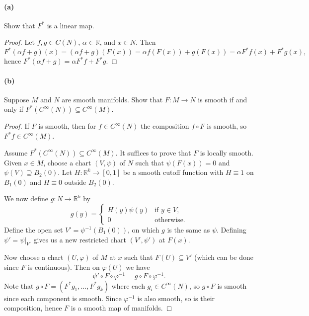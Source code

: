 \documentclass[12pt]{article}
\newlength{\myparskip}
\newenvironment{fullbox}{\begin{lrbox}{\savefullbox}\begin{minipage}{\dimexpr\textwidth-2\fboxsep\relax}\setlength{\parskip}{\myparskip}}{\end{minipage}\end{lrbox}\framebox[\textwidth]{\usebox{\savefullbox}}}
\newenvironment{pbox}[1][]{\begin{fullbox}\def\temp{#1}\ifx\temp\empty\else\paragraph{#1}\phantom{}\fi}{\end{fullbox}}
\theoremstyle{definition}
\newcommand{\R}{\mathbb{R}}
\renewcommand{\phi}{\varphi}
\newcommand{\<}{\langle}
\renewcommand{\>}{\rangle}
\newcommand{\seq}{\subseteq}
\begin{document}
\begin{pbox}[(a)]
    Show that $F^*$ is a linear map.
\end{pbox}

\begin{proof}
    Let $f, g \in C(N)$, $\alpha \in \R$, and $x \in N$.
    Then
    \[
        F^*(\alpha f + g)(x)
            = (\alpha f + g)(F(x))
            = \alpha f(F(x)) + g(F(x))
            = \alpha F^*f(x) + F^*g(x),
    \]
    hence $F^*(\alpha f + g) = \alpha F^*f + F^*g$.
\end{proof}

\begin{pbox}[(b)]
    Suppose $M$ and $N$ are smooth manifolds. Show that $F : M\to N$ is smooth if and only if $F^*(C^\infty(N)) \subseteq C^\infty(M)$.
\end{pbox}



\begin{proof}
    If $F$ is smooth, then for $f \in C^\infty(N)$ the composition $f \circ F$ is smooth, so $F^*f \in C^\infty(M)$.

    Assume $F^*(C^\infty(N)) \seq C^\infty(M)$.
    It suffices to prove that $F$ is locally smooth.
    Given $x \in M$, choose a chart $(V, \psi)$ of $N$ such that $\psi(F(x)) = 0$ and $\psi(V) \supseteq B_2(0)$.
    Let $H : \R^k \to [0,1]$ be a smooth cutoff function with $H \equiv 1$ on $B_1(0)$ and $H \equiv 0$ outside $B_2(0)$.

    We now define $g : N \to \R^k$ by
    \[
        g(y) = \begin{cases}
            H(y)\psi(y) &\text{if } y \in V, \\
            0 &\text{otherwise}.
        \end{cases}
    \]
    Define the open set $V' = \psi^{-1}(B_1(0))$, on which $g$ is the same as $\psi$.
    Defining $\psi' = \psi|_{V'}$ gives us a new restricted chart $(V', \psi')$ at $F(x)$.

    Now choose a chart $(U, \phi)$ of $M$ at $x$ such that $F(U) \seq V'$ (which can be done since $F$ is continuous).
    Then on $\phi(U)$ we have
    \[
        \psi' \circ F \circ \phi^{-1}
            = g \circ F \circ \phi^{-1}.
    \]
    Note that $g \circ F = (F^*g_1, \dots, F^*g_k)$ where each $g_i \in C^\infty(N)$, so $g \circ F$ is smooth since each component is smooth.
    Since $\phi^{-1}$ is also smooth, so is their composition, hence $F$ is a smooth map of manifolds.
\end{proof}
\end{document}
